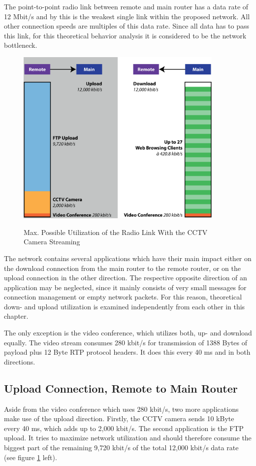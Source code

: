 \documentclass[a4paper,10pt]{book}\usepackage{graphicx}
\begin{document}
The point-to-point radio link between remote and main router has a data rate of 12 Mbit/s and by this is the weakest single link within the proposed network. All other connection speeds are multiples of this data rate. Since all data has to pass this link, for this theoretical behavior analysis it is considered to be the network bottleneck.
\begin{figure}[!ht]
  \centering
    \includegraphics[width=0.9\textwidth]{graphics-01.eps}
    \label{fig:radio_link_theory_on}
    \caption{Max. Possible Utilization of the Radio Link With the CCTV Camera Streaming}
\end{figure}

The network contains several applications which have their main impact either on the download connection from the main router to the remote router, or on the upload connection in the other direction. The respective opposite direction of an application may be neglected, since it mainly consists of very small messages for connection management or empty network packets. For this reason, theoretical down- and upload utilization is examined independently from each other in this chapter. 

The only exception is the video conference, which utilizes both, up- and download equally. The video stream consumes 280 kbit/s for transmission of 1388 Bytes of payload plus 12 Byte RTP protocol headers. It does this every 40 ms and in both directions.

\subsection{Upload Connection, Remote to Main Router}
Aside from the video conference which uses 280 kbit/s, two more applications make use of the upload direction. Firstly, the CCTV camera sends 10 kByte every 40 ms, which adds up to 2,000 kbit/s. The second application is the FTP upload. It tries to maximize network utilization and should therefore consume the biggest part of the remaining 9,720 kbit/s of the total 12,000 kbit/s data rate (see figure \ref{fig:radio_link_theory_on} left).
\end{document}
